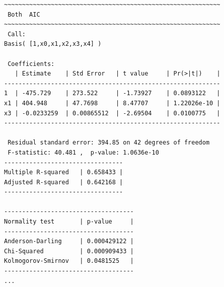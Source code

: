 \begin{lstlisting}[style=output,basicstyle=\tiny]
~~~~~~~~~~~~~~~~~~~~~~~~~~~~~~~~~~~~~~~~~~~~~~~~~~~~~~~~~~~~
 Both  AIC 
~~~~~~~~~~~~~~~~~~~~~~~~~~~~~~~~~~~~~~~~~~~~~~~~~~~~~~~~~~~~
 Call:
Basis( [1,x0,x1,x2,x3,x4] )

 Coefficients:
   | Estimate    | Std Error   | t value     | Pr(>|t|)    | 
------------------------------------------------------------
1  | -475.729    | 273.522     | -1.73927    | 0.0893122   | 
x1 | 404.948     | 47.7698     | 8.47707     | 1.22026e-10 | 
x3 | -0.0233259  | 0.00865512  | -2.69504    | 0.0100775   | 
------------------------------------------------------------

 Residual standard error: 394.85 on 42 degrees of freedom 
 F-statistic: 40.481 ,  p-value: 1.0636e-10
---------------------------------
Multiple R-squared   | 0.658433 | 
Adjusted R-squared   | 0.642168 | 
---------------------------------

------------------------------------
Normality test       | p-value     | 
------------------------------------
Anderson-Darling     | 0.000429122 | 
Chi-Squared          | 0.000909433 | 
Kolmogorov-Smirnov   | 0.0481525   | 
------------------------------------
...
\end{lstlisting}



